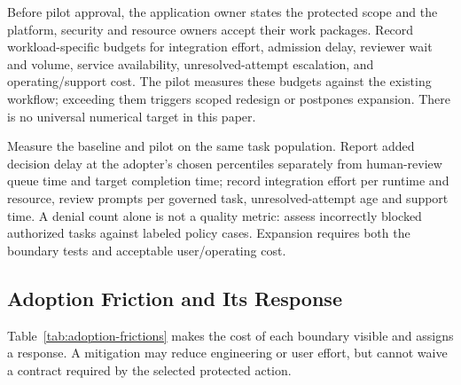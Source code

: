 Before pilot approval, the application owner states the protected scope and the
platform, security and resource owners accept their work packages. Record
workload-specific budgets for integration effort, admission delay, reviewer
wait and volume, service availability, unresolved-attempt escalation, and
operating/support cost. The pilot measures these budgets against the existing
workflow; exceeding them triggers scoped redesign or postpones expansion.
There is no universal numerical target in this paper.

Measure the baseline and pilot on the same task population. Report added
decision delay at the adopter's chosen percentiles separately from human-review
queue time and target completion time; record integration effort per runtime
and resource, review prompts per governed task, unresolved-attempt age and
support time. A denial count alone is not a quality metric: assess incorrectly
blocked authorized tasks against labeled policy cases. Expansion requires both
the boundary tests and acceptable user/operating cost.

\subsection{Adoption Friction and Its Response}
\label{sec:adoption-friction}

Table~\ref{tab:adoption-frictions} makes the cost of each boundary visible and
assigns a response. A mitigation may reduce engineering or user effort, but
cannot waive a contract required by the selected protected action.

